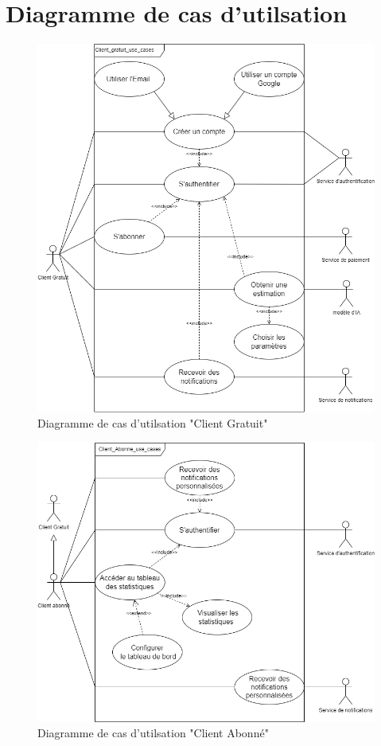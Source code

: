 \documentclass[a4paper,12pt]{report}
\numberwithin{equation}{section}
\begin{document}
\section{Diagramme de cas d'utilsation}
\vspace{0.5cm}
\begin{figure}[h]
    \centering
        \includegraphics[width=\textwidth]{uml-client_gratuit.png}
    \caption{Diagramme de cas d'utilsation "Client Gratuit"}
\end{figure}
\newpage
\vspace*{3.5cm}
\begin{figure}[h]
    \centering
        \includegraphics[width=\textwidth]{uml-Client_abonne.png}
    \caption{Diagramme de cas d'utilsation "Client Abonné"}
\end{figure}
\end{document}
